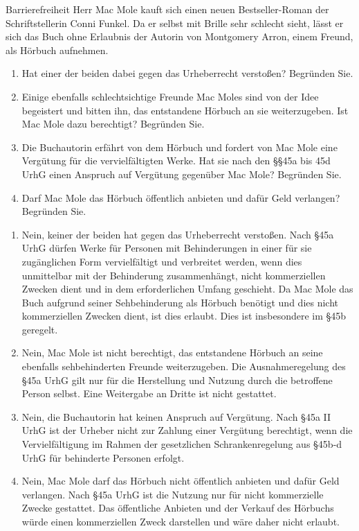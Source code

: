 \documentclass{article}
\begin{document}
\begin{exercise}{Barrierefreiheit}
  Herr Mac Mole kauft sich einen neuen Bestseller-Roman der Schriftstellerin Conni Funkel. Da er selbst mit Brille sehr schlecht sieht, lässt er sich das Buch ohne Erlaubnis der Autorin von Montgomery Arron, einem Freund, als Hörbuch aufnehmen.
  \begin{enumerate}
    \item Hat einer der beiden dabei gegen das Urheberrecht verstoßen? Begründen Sie.
    \item Einige ebenfalls schlechtsichtige Freunde Mac Moles sind von der Idee begeistert und bitten ihn, das entstandene Hörbuch an sie weiterzugeben. Ist Mac Mole dazu berechtigt? Begründen Sie.
    \item Die Buchautorin erfährt von dem Hörbuch und fordert von Mac Mole eine Vergütung für die vervielfältigten Werke. Hat sie nach den §§45a bis 45d UrhG einen Anspruch auf Vergütung gegenüber Mac Mole? Begründen Sie.
    \item Darf Mac Mole das Hörbuch öffentlich anbieten und dafür Geld verlangen? Begründen Sie.
  \end{enumerate}

  \begin{solution}
    \begin{enumerate}
      \item Nein, keiner der beiden hat gegen das Urheberrecht verstoßen. Nach §45a UrhG dürfen Werke für Personen mit Behinderungen in einer für sie zugänglichen Form vervielfältigt und verbreitet werden, wenn dies unmittelbar mit der Behinderung zusammenhängt, nicht kommerziellen Zwecken dient und in dem erforderlichen Umfang geschieht. Da Mac Mole das Buch aufgrund seiner Sehbehinderung als Hörbuch benötigt und dies nicht kommerziellen Zwecken dient, ist dies erlaubt. Dies ist insbesondere im §45b geregelt.
      \item Nein, Mac Mole ist nicht berechtigt, das entstandene Hörbuch an seine ebenfalls sehbehinderten Freunde weiterzugeben. Die Ausnahmeregelung des §45a UrhG gilt nur für die Herstellung und Nutzung durch die betroffene Person selbst. Eine Weitergabe an Dritte ist nicht gestattet.
      \item Nein, die Buchautorin hat keinen Anspruch auf Vergütung. Nach §45a II UrhG ist der Urheber nicht zur Zahlung einer Vergütung berechtigt, wenn die Vervielfältigung im Rahmen der gesetzlichen Schrankenregelung aus §45b-d UrhG für behinderte Personen erfolgt.
      \item Nein, Mac Mole darf das Hörbuch nicht öffentlich anbieten und dafür Geld verlangen. Nach §45a UrhG ist die Nutzung nur für nicht kommerzielle Zwecke gestattet. Das öffentliche Anbieten und der Verkauf des Hörbuchs würde einen kommerziellen Zweck darstellen und wäre daher nicht erlaubt.
    \end{enumerate}
  \end{solution}
\end{exercise}
\end{document}
